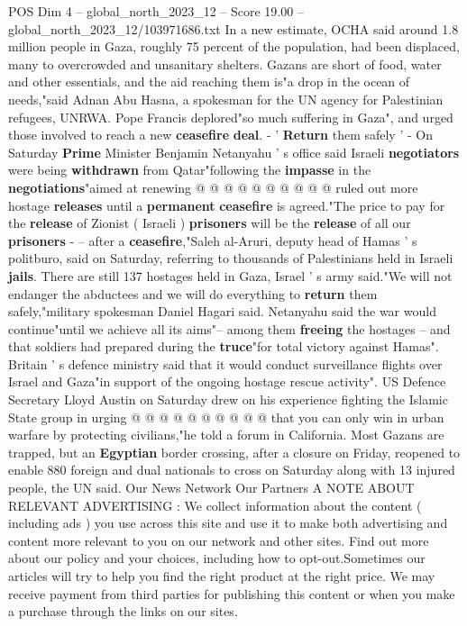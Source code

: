 \begin{textsample}{POS Dim 4 – global\_north\_2023\_12 – Score 19.00 – global\_north\_2023\_12/103971686.txt}
In a new estimate, OCHA said around 1.8 million people in Gaza, roughly 75 percent of the population, had been displaced, many to overcrowded and unsanitary shelters.
Gazans are short of food, water and other essentials, and the aid reaching them is"a drop in the ocean of needs,"said Adnan Abu Hasna, a spokesman for the UN agency for Palestinian refugees, UNRWA.
Pope Francis deplored"so much suffering in Gaza", and urged those involved to reach a new \textbf{ceasefire} \textbf{deal}. - ' \textbf{Return} them safely ' - On Saturday \textbf{Prime} Minister Benjamin Netanyahu ' s office said Israeli \textbf{negotiators} were being \textbf{withdrawn} from Qatar"following the \textbf{impasse} in the \textbf{negotiations}"aimed at renewing @ @ @ @ @ @ @ @ @ @ ruled out more hostage \textbf{releases} until a \textbf{permanent} \textbf{ceasefire} is agreed."The price to pay for the \textbf{release} of Zionist ( Israeli ) \textbf{prisoners} will be the \textbf{release} of all our \textbf{prisoners} - -- after a \textbf{ceasefire},"Saleh al-Aruri, deputy head of Hamas ' s politburo, said on Saturday, referring to thousands of Palestinians held in Israeli \textbf{jails}.
There are still 137 hostages held in Gaza, Israel ' s army said."We will not endanger the abductees and we will do everything to \textbf{return} them safely,"military spokesman Daniel Hagari said.
Netanyahu said the war would continue"until we achieve all its aims"-- among them \textbf{freeing} the hostages -- and that soldiers had prepared during the \textbf{truce}"for total victory against Hamas".
Britain ' s defence ministry said that it would conduct surveillance flights over Israel and Gaza"in support of the ongoing hostage rescue activity".
US Defence Secretary Lloyd Austin on Saturday drew on his experience fighting the Islamic State group in urging @ @ @ @ @ @ @ @ @ @ that you can only win in urban warfare by protecting civilians,"he told a forum in California.
Most Gazans are trapped, but an \textbf{Egyptian} border crossing, after a closure on Friday, reopened to enable 880 foreign and dual nationals to cross on Saturday along with 13 injured people, the UN said.
Our News Network Our Partners A NOTE ABOUT RELEVANT ADVERTISING : We collect information about the content ( including ads ) you use across this site and use it to make both advertising and content more relevant to you on our network and other sites.
Find out more about our policy and your choices, including how to opt-out.Sometimes our articles will try to help you find the right product at the right price.
We may receive payment from third parties for publishing this content or when you make a purchase through the links on our sites.

\end{textsample}
